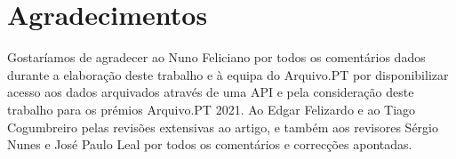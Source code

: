 \documentclass[a4paper, twocolumn, 11pt, twoside]{article}
\begin{document}
\section*{Agradecimentos}

Gostaríamos de agradecer ao Nuno Feliciano por todos os comentários dados durante a elaboração deste trabalho e à equipa do Arquivo.PT por disponibilizar acesso aos dados arquivados através de uma API e pela consideração deste trabalho para os prémios Arquivo.PT 2021. Ao Edgar Felizardo e ao Tiago Cogumbreiro pelas revisões extensivas ao artigo, e também aos revisores Sérgio Nunes e José Paulo Leal por todos os comentários e correcções apontadas.


\end{document}
